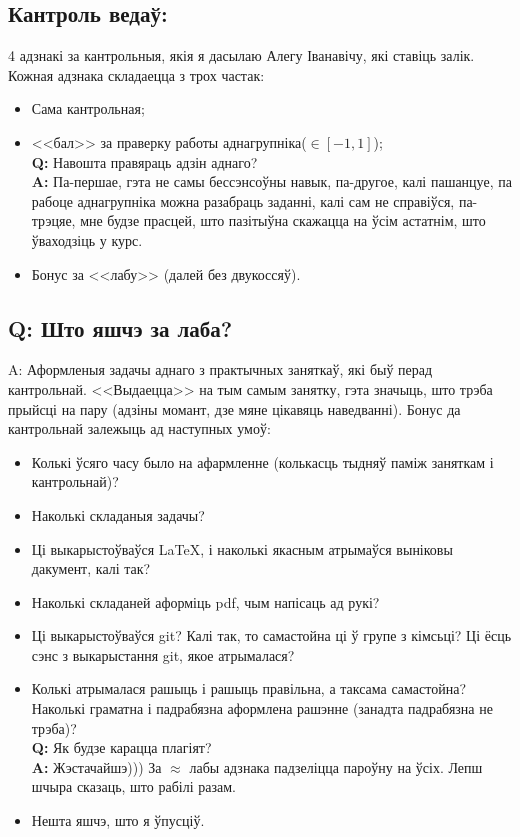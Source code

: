 \documentclass[12pt, a4paper]{extarticle}
\begin{document}
	\subsection{Кантроль ведаў:}
	4 адзнакі за кантрольныя, якія я дасылаю Алегу Іванавічу, які ставіць залік. Кожная адзнака складаецца з трох частак: 
	\begin{itemize}
		\item Сама кантрольная;
		\item <<бал>> за праверку работы аднагрупніка($\in [-1, 1]$); \\[6pt]
		\textbf{Q:} Навошта правяраць адзін аднаго? \\
		\textbf{A:} Па-першае, гэта не самы бессэнсоўны навык, па-другое, калі пашанцуе, па рабоце аднагрупніка можна разабраць заданні, калі сам не справіўся, па-трэцяе, мне будзе прасцей, што пазітыўна скажацца на ўсім астатнім, што ўваходзіць у курс.
		\item Бонус за <<лабу>> (далей без двукоссяў).
	\end{itemize}
	
	\subsection{Q: Што яшчэ за лаба?}
	{\large A:} Аформленыя задачы аднаго з практычных заняткаў, які быў перад кантрольнай. <<Выдаецца>> на тым самым занятку, гэта значыць, што трэба прыйсці на пару (адзіны момант, дзе мяне цікавяць наведванні). Бонус да кантрольнай залежыць ад наступных умоў:
	\begin{itemize}
		\item Колькі ўсяго часу было на афармленне (колькасць тыдняў паміж заняткам і кантрольнай)?
		\item Наколькі складаныя задачы?
		\item Ці выкарыстоўваўся \LaTeX, і наколькі якасным атрымаўся выніковы дакумент, калі так?
		\item Наколькі складаней аформіць pdf, чым напісаць ад рукі?
		\item Ці выкарыстоўваўся git? Калі так, то самастойна ці ў групе з кімсьці? Ці ёсць сэнс з выкарыстання git, якое атрымалася?
		\item Колькі атрымалася рашыць і рашыць правільна, а таксама самастойна? Наколькі граматна і падрабязна аформлена рашэнне (занадта падрабязна не трэба)? \\[6pt]
		\textbf{Q:} Як будзе карацца плагіят? \\
		\textbf{A:} Жэстачайшэ))) За $\approx$ лабы адзнака падзеліцца пароўну на ўсіх. Лепш шчыра сказаць, што рабілі разам. 
		\item Нешта яшчэ, што я ўпусціў.
	\end{itemize}
\end{document}
